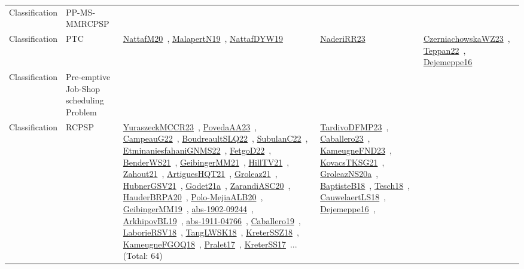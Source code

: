 {\begin{longtable}{lp{3cm}>{\raggedright\arraybackslash}p{6cm}>{\raggedright\arraybackslash}p{6cm}>{\raggedright\arraybackslash}p{8cm}}
Classification & PP-MS-MMRCPSP &  &  & \\
Classification & PTC & \href{works/NattafM20.pdf}{NattafM20}~\cite{NattafM20}, \href{works/MalapertN19.pdf}{MalapertN19}~\cite{MalapertN19}, \href{works/NattafDYW19.pdf}{NattafDYW19}~\cite{NattafDYW19} & \href{works/NaderiRR23.pdf}{NaderiRR23}~\cite{NaderiRR23} & \href{works/CzerniachowskaWZ23.pdf}{CzerniachowskaWZ23}~\cite{CzerniachowskaWZ23}, \href{works/Teppan22.pdf}{Teppan22}~\cite{Teppan22}, \href{works/Dejemeppe16.pdf}{Dejemeppe16}~\cite{Dejemeppe16}\\
Classification & Pre-emptive Job-Shop scheduling Problem &  &  & \\
Classification & RCPSP & \href{works/YuraszeckMCCR23.pdf}{YuraszeckMCCR23}~\cite{YuraszeckMCCR23}, \href{works/PovedaAA23.pdf}{PovedaAA23}~\cite{PovedaAA23}, \href{works/CampeauG22.pdf}{CampeauG22}~\cite{CampeauG22}, \href{works/BoudreaultSLQ22.pdf}{BoudreaultSLQ22}~\cite{BoudreaultSLQ22}, \href{works/SubulanC22.pdf}{SubulanC22}~\cite{SubulanC22}, \href{works/EtminaniesfahaniGNMS22.pdf}{EtminaniesfahaniGNMS22}~\cite{EtminaniesfahaniGNMS22}, \href{works/FetgoD22.pdf}{FetgoD22}~\cite{FetgoD22}, \href{works/BenderWS21.pdf}{BenderWS21}~\cite{BenderWS21}, \href{works/GeibingerMM21.pdf}{GeibingerMM21}~\cite{GeibingerMM21}, \href{works/HillTV21.pdf}{HillTV21}~\cite{HillTV21}, \href{works/Zahout21.pdf}{Zahout21}~\cite{Zahout21}, \href{works/ArtiguesHQT21.pdf}{ArtiguesHQT21}~\cite{ArtiguesHQT21}, \href{works/Groleaz21.pdf}{Groleaz21}~\cite{Groleaz21}, \href{works/HubnerGSV21.pdf}{HubnerGSV21}~\cite{HubnerGSV21}, \href{works/Godet21a.pdf}{Godet21a}~\cite{Godet21a}, \href{works/ZarandiASC20.pdf}{ZarandiASC20}~\cite{ZarandiASC20}, \href{works/HauderBRPA20.pdf}{HauderBRPA20}~\cite{HauderBRPA20}, \href{works/Polo-MejiaALB20.pdf}{Polo-MejiaALB20}~\cite{Polo-MejiaALB20}, \href{works/GeibingerMM19.pdf}{GeibingerMM19}~\cite{GeibingerMM19}, \href{works/abs-1902-09244.pdf}{abs-1902-09244}~\cite{abs-1902-09244}, \href{works/ArkhipovBL19.pdf}{ArkhipovBL19}~\cite{ArkhipovBL19}, \href{works/abs-1911-04766.pdf}{abs-1911-04766}~\cite{abs-1911-04766}, \href{works/Caballero19.pdf}{Caballero19}~\cite{Caballero19}, \href{works/LaborieRSV18.pdf}{LaborieRSV18}~\cite{LaborieRSV18}, \href{works/TangLWSK18.pdf}{TangLWSK18}~\cite{TangLWSK18}, \href{works/KreterSSZ18.pdf}{KreterSSZ18}~\cite{KreterSSZ18}, \href{works/KameugneFGOQ18.pdf}{KameugneFGOQ18}~\cite{KameugneFGOQ18}, \href{works/Pralet17.pdf}{Pralet17}~\cite{Pralet17}, \href{works/KreterSS17.pdf}{KreterSS17}~\cite{KreterSS17}... (Total: 64) & \href{works/TardivoDFMP23.pdf}{TardivoDFMP23}~\cite{TardivoDFMP23}, \href{works/Caballero23.pdf}{Caballero23}~\cite{Caballero23}, \href{works/KameugneFND23.pdf}{KameugneFND23}~\cite{KameugneFND23}, \href{works/KovacsTKSG21.pdf}{KovacsTKSG21}~\cite{KovacsTKSG21}, \href{works/GroleazNS20a.pdf}{GroleazNS20a}~\cite{GroleazNS20a}, \href{works/BaptisteB18.pdf}{BaptisteB18}~\cite{BaptisteB18}, \href{works/Tesch18.pdf}{Tesch18}~\cite{Tesch18}, \href{works/CauwelaertLS18.pdf}{CauwelaertLS18}~\cite{CauwelaertLS18}, \href{works/Dejemeppe16.pdf}{Dejemeppe16}~\cite{Dejemeppe16}, 
\end{longtable}}
